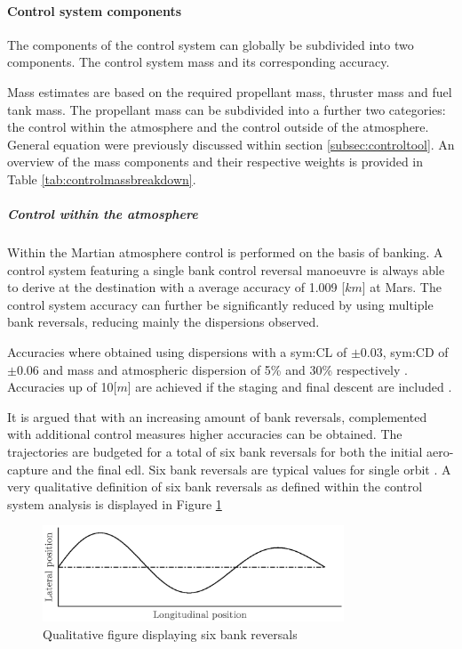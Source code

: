 \paragraph{Control system components}

The components of the control system can  globally be subdivided into two components. The control system mass and its corresponding accuracy.

Mass estimates are based on the required propellant mass, thruster mass and fuel tank mass. The propellant mass can be subdivided into a further two categories: the control within the atmosphere and the control outside of the atmosphere. General equation were previously discussed within section \ref{subsec:controltool}. An overview of the mass components and their respective weights is provided in Table \ref{tab:controlmassbreakdown}.

\subparagraph{Control within the atmosphere} 

Within the Martian atmosphere control is performed on the basis of banking. A control system featuring a single bank control reversal manoeuvre is always able to derive at the destination with a average accuracy of 1.009 [$km$]\cite{Lu2007} at Mars. The control system accuracy can further be significantly reduced by using multiple bank reversals, reducing mainly the dispersions observed. 

Accuracies where obtained using dispersions with a \gls{sym:CL} of $\pm 0.03 $, \gls{sym:CD}  of $\pm 0.06 $ and mass and atmospheric dispersion of 5\% and 30\% respectively \cite{Lu2007}. Accuracies up of 10[$m$] are achieved if the staging and final descent are included \cite{Davis2010}. 

It is argued that with an increasing amount of bank reversals, complemented with additional control measures higher accuracies can be obtained. The trajectories are budgeted for a total of six bank reversals for both the initial aero-capture and the final \gls{edl}. Six bank reversals are typical values for single orbit \cite{Lu2007, Cianciolo2010}. A very qualitative definition of six bank reversals as defined within the control system analysis is displayed in Figure \ref{fig:bankdef}

\begin{figure}[h]
	\centering
	\includegraphics[width=0.8\textwidth]{./Figure/control/bankdef.eps}
	\caption{Qualitative figure displaying six bank reversals}
	\label{fig:bankdef}
\end{figure}

